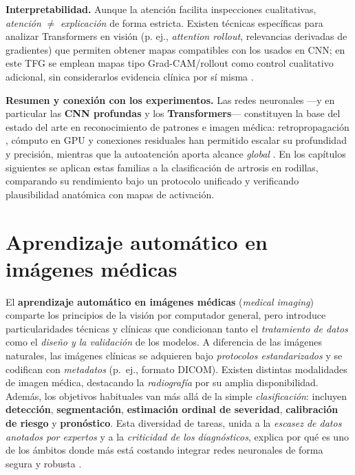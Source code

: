 \documentclass[11pt,spanish,listoffigures,listoftables]{tfgetsinf}
\begin{document}
\medskip
\noindent \textbf{Interpretabilidad.} Aunque la atención facilita inspecciones cualitativas, \textit{atención} $\neq$ \textit{explicación} de forma estricta. Existen técnicas específicas para analizar Transformers en visión (p. ej., \textit{attention rollout}, relevancias derivadas de gradientes) que permiten obtener mapas compatibles con los usados en CNN; en este TFG se emplean mapas tipo Grad-CAM/rollout como control cualitativo adicional, sin considerarlos evidencia clínica por sí misma \cite{Chefer2021}.

\medskip
\noindent \textbf{Resumen y conexión con los experimentos.} Las redes neuronales —y en particular las \textbf{CNN profundas} y los \textbf{Transformers}— constituyen la base del estado del arte en reconocimiento de patrones e imagen médica: retropropagación \cite{Rumelhart1986}, cómputo en GPU \cite{Krizhevsky2012} y conexiones residuales \cite{He2016} han permitido escalar su profundidad y precisión, mientras que la autoatención aporta alcance \textit{global} \cite{Dosovitskiy2021,Touvron2021,Liu2021Swin}. En los capítulos siguientes se aplican estas familias a la clasificación de artrosis en rodillas, comparando su rendimiento bajo un protocolo unificado y verificando plausibilidad anatómica con mapas de activación.

\section{Aprendizaje automático en imágenes médicas}\label{sec:ml-en-imagenes-medicas}

El \textbf{aprendizaje automático en imágenes médicas} (\emph{medical imaging})
comparte los principios de la visión por computador general, pero introduce
particularidades técnicas y clínicas que condicionan tanto el \emph{tratamiento
	de datos} como el \emph{diseño y la validación} de los modelos. A diferencia de
las imágenes naturales, las imágenes clínicas se adquieren bajo
\emph{protocolos estandarizados} y se codifican con \emph{metadatos} (p.~ej.,
formato DICOM). Existen distintas modalidades de imagen médica, destacando la
\emph{radiografía} por su amplia disponibilidad. Además, los objetivos
habituales van más allá de la simple \emph{clasificación}: incluyen
\textbf{detección}, \textbf{segmentación}, \textbf{estimación ordinal de
	severidad}, \textbf{calibración de riesgo} y \textbf{pronóstico}. Esta
diversidad de tareas, unida a la \emph{escasez de datos anotados por expertos}
y a la \emph{criticidad de los diagnósticos}, explica por qué es uno de los
ámbitos donde más está costando integrar redes neuronales de forma segura y
robusta \cite{liu_meta_analysis}.
\end{document}
